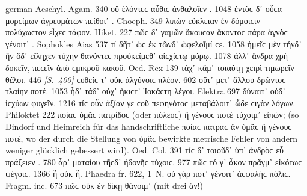 \begin{otherlanguage*}{german}
Aeschyl. Agam. 340 οὔ  ἑλόντεϲ αὖθιϲ ἀνθαλοῖεν . 1048 ἐντὸϲ δ᾽  οὖϲα μορϲίμων ἀγρευμάτων πείθοι᾽ . Choeph. 349 λιπὼν  εὔκλειαν ἐν δόμοιϲιν — πολύχωϲτον  εἶχεϲ τάφον. Hiket. 227 πῶϲ δ᾽  γαμῶν ἄκουϲαν ἄκοντοϲ πάρα ἁγνὸϲ γένοιτ᾽ . Sophokles Aias 537 τί δῆτ᾽  ὡϲ ἐκ τῶνδ᾽  ὠφελοῖμί ϲε. 1058 ἡμεῖϲ μὲν  τήνδ᾽ ἣν ὅδ᾽ εἴληχεν τύχην θανόντεϲ  προὐκείμεθ᾽ αἰϲχίϲτῳ μόρῳ. 1078 ἀλλ᾽ ἄνδρα χρὴ — δοκεῖν, πεϲεῖν   ἀπὸ ϲμικροῦ κακοῦ. Oed. Rex 139 τάχ᾽  κἄμ᾽  τοιαύτῃ χειρὶ τιμωρεῖν θέλοι. 446 \hypertarget{p400}{\emph{[S.~400]}}\label{p400} ϲυθείϲ τ᾽  οὐκ  ἀλγύνοιϲ πλέον. 602 οὔτ᾽  μετ᾽ ἄλλου δρῶντοϲ  τλαίην ποτέ. 1053 ἧδ᾽  τάδ᾽ οὐχ᾽ ἥκιϲτ᾽  Ἰοκάϲτη λέγοι. Elektra 697 δύναιτ᾽  οὐδ᾽  ἰϲχύων φυγεῖν. 1216 τίϲ οὖν  ἀξίαν γε ϲοῦ πεφηνότοϲ μεταβάλοιτ᾽  ὧδε ϲιγὰν λόγων. Philoktet 222 ποίαϲ  ὑμᾶϲ πατρίδοϲ (oder πόλεοϲ) ἢ γένουϲ ποτὲ τύχοιμ᾽  εἰπών; (so Dindorf und Heimreich für das handschriftliche ποίαϲ πάτραϲ ἂν ὑμᾶϲ ἢ γένουϲ ποτέ, wo der durch die Stellung von ὑμᾶϲ bewirkte metrische Fehler von andern weniger glücklich gebessert wird). Oed. Col. 391 τίϲ δ᾽  τοιοῦδ᾽ ὑπ᾽ ἀνδρὸϲ εὖ πράξειεν . 780 ἆρ᾽  ματαίου τῆϲδ᾽  ἡδονῆϲ τύχοιϲ. 977 πῶϲ  τό γ᾽ ἆκον πρᾶγμ᾽  εἰκότωϲ ψέγοιϲ. 1366 ἦ  οὐκ  ἦ. Phaedra fr. 622, 1~Ν. οὐ γάρ ποτ᾽  γένοιτ᾽  ἀϲφαλὴϲ πόλιϲ. Fragm. inc. 673 πῶϲ  οὐκ  ἐν δίκῃ θάνοιμ᾽  (mit drei ἄν!)


\end{otherlanguage*}
